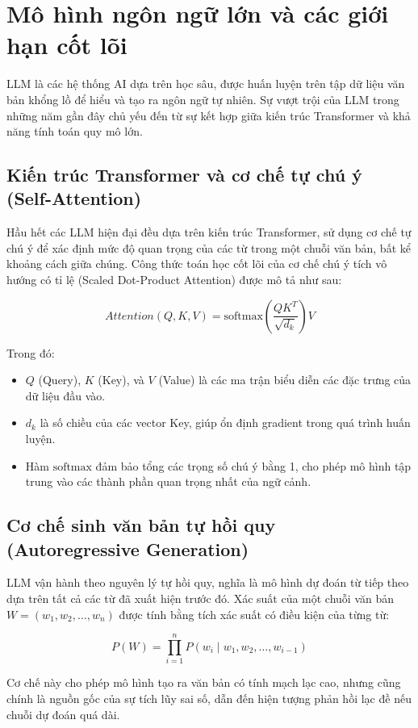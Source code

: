 \section{Mô hình ngôn ngữ lớn và các giới hạn cốt lõi}

LLM là các hệ thống AI dựa trên học sâu, được huấn luyện trên tập dữ liệu văn bản khổng lồ để hiểu và tạo ra ngôn ngữ tự nhiên. Sự vượt trội của LLM trong những năm gần đây chủ yếu đến từ sự kết hợp giữa kiến trúc Transformer và khả năng tính toán quy mô lớn. \cite{vaswani2017attention,radford2019language,dubey2024llama}

\subsection{Kiến trúc Transformer và cơ chế tự chú ý (Self-Attention)}
Hầu hết các LLM hiện đại đều dựa trên kiến trúc Transformer, sử dụng cơ chế tự chú ý để xác định mức độ quan trọng của các từ trong một chuỗi văn bản, bất kể khoảng cách giữa chúng. Công thức toán học cốt lõi của cơ chế chú ý tích vô hướng có tỉ lệ (Scaled Dot-Product Attention) được mô tả như sau:

\[
Attention(Q, K, V) = \text{softmax}\left(\frac{QK^T}{\sqrt{d_k}}\right)V
\]

Trong đó:
\begin{itemize}
    \item $Q$ (Query), $K$ (Key), và $V$ (Value) là các ma trận biểu diễn các đặc trưng của dữ liệu đầu vào.
    \item $d_k$ là số chiều của các vector Key, giúp ổn định gradient trong quá trình huấn luyện.
    \item Hàm $\text{softmax}$ đảm bảo tổng các trọng số chú ý bằng 1, cho phép mô hình tập trung vào các thành phần quan trọng nhất của ngữ cảnh.
\end{itemize}

\subsection{Cơ chế sinh văn bản tự hồi quy (Autoregressive Generation)}
LLM vận hành theo nguyên lý tự hồi quy, nghĩa là mô hình dự đoán từ tiếp theo dựa trên tất cả các từ đã xuất hiện trước đó. Xác suất của một chuỗi văn bản $W = (w_1, w_2, \dots, w_n)$ được tính bằng tích xác suất có điều kiện của từng từ:

\[
P(W) = \prod_{i=1}^{n} P(w_i \mid w_1, w_2, \dots, w_{i-1})
\]

Cơ chế này cho phép mô hình tạo ra văn bản có tính mạch lạc cao, nhưng cũng chính là nguồn gốc của sự tích lũy sai số, dẫn đến hiện tượng phản hồi lạc đề nếu chuỗi dự đoán quá dài.


